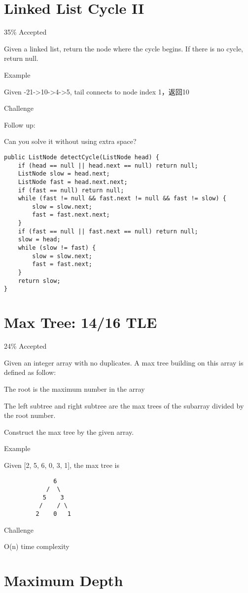 \documentclass[9pt, b5paaper]{book}
\begin{document}
\section{Linked List Cycle II}
\label{sec-1-36}

35\% Accepted

Given a linked list, return the node where the cycle begins. If there is no cycle, return null.

Example

Given -21->10->4->5, tail connects to node index 1，返回10

Challenge

Follow up:

Can you solve it without using extra space? 
\begin{verbatim}
public ListNode detectCycle(ListNode head) {  
    if (head == null || head.next == null) return null;
    ListNode slow = head.next;
    ListNode fast = head.next.next;
    if (fast == null) return null;
    while (fast != null && fast.next != null && fast != slow) {
        slow = slow.next;
        fast = fast.next.next;
    }
    if (fast == null || fast.next == null) return null;
    slow = head;
    while (slow != fast) {
        slow = slow.next;
        fast = fast.next;
    }
    return slow;
}
\end{verbatim}
\section{Max Tree: 14/16 TLE}
\label{sec-1-37}

24\% Accepted

Given an integer array with no duplicates. A max tree building on this array is defined as follow:

The root is the maximum number in the array

The left subtree and right subtree are the max trees of the subarray divided by the root number.

Construct the max tree by the given array.

Example

Given [2, 5, 6, 0, 3, 1], the max tree is
\begin{verbatim}
              6
            /  \
           5    3
          /    / \
         2    0   1
\end{verbatim}
Challenge

O(n) time complexity
\section{Maximum Depth}
\label{sec-1-38}
\end{document}
